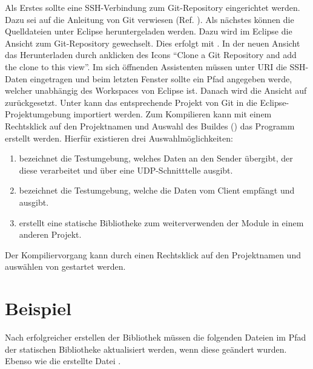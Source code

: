 Als Erstes sollte eine SSH-Verbindung zum Git-Repository eingerichtet werden.
Dazu sei auf die Anleitung von Git verwiesen
(Ref. \cite{web7}). Als n{\"a}chstes k{\"o}nnen
die Quelldateien unter Eclipse heruntergeladen werden. Dazu wird im Eclipse die
Ansicht zum Git-Repository gewechselt. Dies erfolgt mit . In der neuen Ansicht das Herunterladen durch anklicken des
Icons "`Clone a Git Repository and add the clone to this view"'. Im sich {\"o}ffnenden
Assistenten m{\"u}ssen unter URI die SSH-Daten
 eingetragen und
beim letzten Fenster sollte ein Pfad angegeben werde, welcher
unabh{\"a}ngig des Workspaces von Eclipse ist.\newline
Danach wird die Ansicht auf 
zur{\"u}ckgesetzt. Unter  kann das entsprechende Projekt von Git
in die Eclipse-Projektumgebung importiert werden. Zum Kompilieren kann
mit einem Rechtsklick auf den Projektnamen und Auswahl des Buildes () das Programm erstellt werden. Hierf{\"u}r existieren
drei Auswahlm{\"o}glichkeiten:

\begin{enumerate}
\item {} bezeichnet die Testumgebung, welches
Daten an den Sender {\"u}bergibt, der diese verarbeitet und {\"u}ber eine
\gls{UDP}-Schnitttelle ausgibt.
\item {} bezeichnet die Testumgebung, welche die
Daten vom Client empf{\"a}ngt und ausgibt.
\item {} erstellt eine statische Bibliotheke zum weiterverwenden der
Module in einem anderen Projekt.
\end{enumerate}

Der Kompiliervorgang kann durch einen Rechtsklick auf den Projektnamen und
ausw{\"a}hlen von  gestartet werden.

\section{Beispiel}

Nach erfolgreicher erstellen der Bibliothek m{\"u}ssen die folgenden Dateien
im Pfad  der statischen Bibliotheke aktualisiert werden,
wenn diese ge{\"a}ndert wurden. Ebenso wie die erstellte Datei
.

